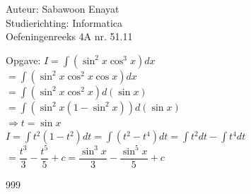 \documentclass[a4paper]{article}
\begin{document}
  
\noindent \large Auteur: Sabawoon Enayat \\
\noindent \large Studierichting: Informatica\\
\noindent \large Oefeningenreeks 4A nr. 51.11 \\

\newcommand{\dint}{\displaystyle\int}

\medskip

\normalsize

Opgave: $I = \dint \left(\sin^2 x \cos^3 x\right) dx$\\

$= \dint \left(\sin^2 x \cos^2 x \cos x\right) dx$\\

$= \dint \left(\sin^2 x \cos^2 x\right) d(\sin x)$\\

$= \dint \left(\sin^2 x \left(1 - \sin^2 x\right)\right) d(\sin x)$\\

$\Rightarrow t = \sin x$\\

$I = \dint t^2 \left(1 - t^2\right) dt = \dint \left(t^2 - t^4\right) dt = \dint t^2 dt - \dint t^4 dt$\\

$= \dfrac{t^3}{3} - \dfrac{t^5}{5} + c = \dfrac{\sin^3 x}{3} - \dfrac{\sin^5 x}{5} + c$\\

\begin{thebibliography}{999}
\end{thebibliography}
\end{document}
